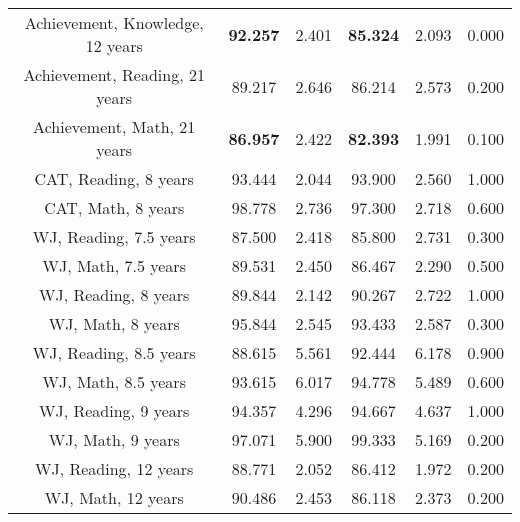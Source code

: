 \begin{longtable}{c c c c c c}
Achievement, Knowledge, 12 years & \textbf{92.257} & 2.401 &  \textbf{85.324} & 2.093 & 0.000 \\
Achievement, Reading, 21 years & 89.217 & 2.646 &  86.214 & 2.573 & 0.200 \\
Achievement, Math, 21 years & \textbf{86.957} & 2.422 &  \textbf{82.393} & 1.991 & 0.100 \\
CAT, Reading, 8 years & 93.444 & 2.044 &  93.900 & 2.560 & 1.000 \\
CAT, Math, 8 years & 98.778 & 2.736 &  97.300 & 2.718 & 0.600 \\
WJ, Reading, 7.5 years & 87.500 & 2.418 &  85.800 & 2.731 & 0.300 \\
WJ, Math, 7.5 years & 89.531 & 2.450 &  86.467 & 2.290 & 0.500 \\
WJ, Reading, 8 years & 89.844 & 2.142 &  90.267 & 2.722 & 1.000 \\
WJ, Math, 8 years & 95.844 & 2.545 &  93.433 & 2.587 & 0.300 \\
WJ, Reading, 8.5 years & 88.615 & 5.561 &  92.444 & 6.178 & 0.900 \\
WJ, Math, 8.5 years & 93.615 & 6.017 &  94.778 & 5.489 & 0.600 \\
WJ, Reading, 9 years & 94.357 & 4.296 &  94.667 & 4.637 & 1.000 \\
WJ, Math, 9 years & 97.071 & 5.900 &  99.333 & 5.169 & 0.200 \\
WJ, Reading, 12 years & 88.771 & 2.052 &  86.412 & 1.972 & 0.200 \\
WJ, Math, 12 years & 90.486 & 2.453 &  86.118 & 2.373 & 0.200 \\
\bottomrule
\end{longtable}
